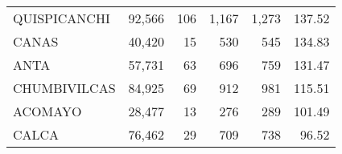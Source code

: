 \begin{tabular}{lrrrrr}
	\cellcolor[HTML]{FFFFC7}QUISPICANCHI                                               & 92,566                                                         & 106                                                      & 1,167                                                    & 1,273                                                               & 137.52                                                                       \\
	\cellcolor[HTML]{FFFFC7}CANAS                                                      & 40,420                                                         & 15                                                       & 530                                                      & 545                                                                 & 134.83                                                                       \\
	\cellcolor[HTML]{FFFFC7}ANTA                                                       & 57,731                                                         & 63                                                       & 696                                                      & 759                                                                 & 131.47                                                                       \\
	\cellcolor[HTML]{9AFF99}CHUMBIVILCAS                                               & 84,925                                                         & 69                                                       & 912                                                      & 981                                                                 & 115.51                                                                       \\
	\cellcolor[HTML]{9AFF99}ACOMAYO                                                    & 28,477                                                         & 13                                                       & 276                                                      & 289                                                                 & 101.49                                                                       \\
	\cellcolor[HTML]{9AFF99}CALCA                                                      & 76,462                                                         & 29                                                       & 709                                                      & 738                                                                 & 96.52                                                                        \\

\end{tabular}
